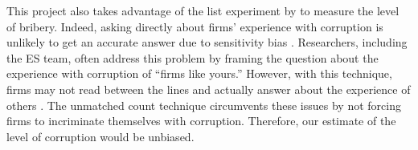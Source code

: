 This project also takes advantage of the list experiment by \citet{Malesky2015} to measure the level of bribery. Indeed, asking directly about firms' experience with corruption is unlikely to get an accurate answer due to sensitivity bias \citep{Coutts2011}. Researchers, including the ES team, often address this problem by framing the question about the experience with corruption of ``firms like yours.'' However, with this technique, firms may not read between the lines and actually answer about the experience of others \citep{Ahart2004}. The unmatched count technique circumvents these issues by not forcing firms to incriminate themselves with corruption. Therefore, our estimate of the level of corruption would be unbiased.
